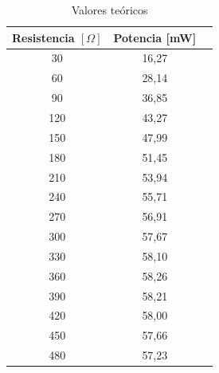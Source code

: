 \documentclass{article}
\begin{document}
            \begin{table}[H]
            \centering
                \begin{tabular}{|c|c|c|}
                \hline
                Resistencia  $[\Omega]$     & Potencia [mW]         \\ \hline
                30                          & 16,27                 \\ \hline
                60                          & 28,14                 \\ \hline
                90                          & 36,85                 \\ \hline
                120                         & 43,27                 \\ \hline
                150                         & 47,99                 \\ \hline
                180                         & 51,45                 \\ \hline
                210                         & 53,94                 \\ \hline
                240                         & 55,71                 \\ \hline
                270                         & 56,91                 \\ \hline
                300                         & 57,67                 \\ \hline
                330                         & 58,10                 \\ \hline
                360                         & 58,26                 \\ \hline
                390                         & 58,21                 \\ \hline
                420                         & 58,00                 \\ \hline
                450                         & 57,66                 \\ \hline
                480                         & 57,23                 \\ \hline
                \end{tabular}
            \caption{Valores teóricos}
            \label{tab:ValoresTeoricos2daParte}
            \end{table}
\end{document}
